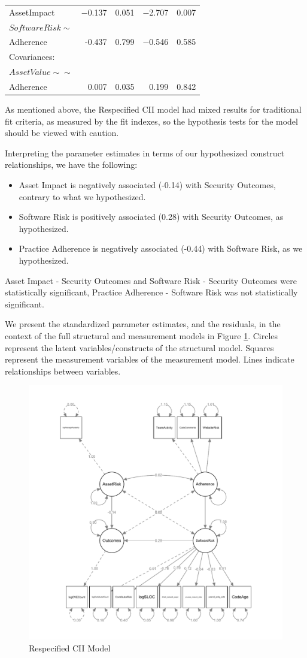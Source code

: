\begin{table}
\begin{center}
\begin{tabular}{l|rrrr}
			AssetImpact     &   $-$0.137  &  0.051  &  $-$2.707 &   0.007\\
			$SoftwareRisk \sim$        & & & & \\                                  
			Adherence     &    -0.437 &   0.799  &  $-$0.546 &   0.585\\
			Covariances:  & & & & \\  
			$AssetValue \sim\sim$          & & & & \\                                 
			Adherence      &  0.007  &  0.035 &  0.199 &   0.842\\
		\end{tabular}
	\end{center}
\end{table}

As mentioned above, the Respecified CII model had mixed results for traditional fit criteria, as measured by the fit indexes, so the hypothesis tests for the model should be viewed with caution. 

Interpreting the parameter estimates in terms of our hypothesized construct relationships, we have the following:
\begin{itemize}
	\item  Asset Impact is negatively associated (-0.14) with Security Outcomes, contrary to what we hypothesized.
	\item Software Risk is positively associated (0.28) with Security Outcomes, as hypothesized. 
	\item Practice Adherence is negatively associated (-0.44) with Software Risk,  
	as we hypothesized. 
\end{itemize}	
Asset Impact - Security Outcomes and Software Risk - Security Outcomes were statistically significant, Practice Adherence - Software Risk was not statistically significant. 

We present the standardized parameter estimates, and the residuals, in the context of the full structural and measurement models in Figure \ref{fig:cii_model_respecified_estimates}. Circles represent the latent variables/constructs of the structural model. Squares represent the measurement variables of the measurement model. Lines indicate relationships between variables.

\begin{figure}
	\centering
	\includegraphics[width=.6\textwidth]{CII_Respecified_SEM_Model.pdf}
	\caption{Respecified CII Model}
	\label{fig:cii_model_respecified_estimates}
\end{figure}
 